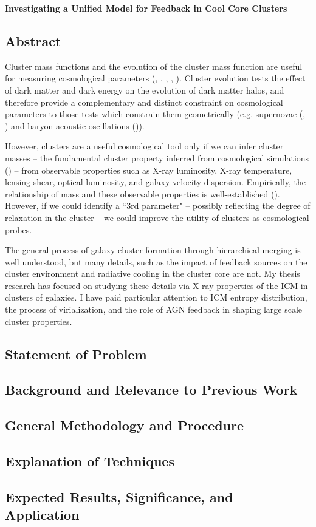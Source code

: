 \documentclass[11pt]{article}
\begin{document}
\begin{center}
\textbf{Investigating a Unified Model for Feedback in Cool Core Clusters}\\
\end{center}
\normalsize

\subsection*{Abstract}
Cluster mass functions and the evolution of the cluster mass function
are useful for measuring cosmological parameters
(\cite{1989ApJ...341L..71E}, \cite{1998ApJ...508..483W}, \cite{2001ApJ...553..545H},
\cite{2003PhRvD..67h1304H}, \cite{2004PhRvD..70l3008W}). Cluster evolution tests the
effect of dark matter and dark energy on the evolution of dark matter
halos, and therefore provide a complementary and distinct constraint
on cosmological parameters to those tests which constrain
them geometrically (e.g. supernovae (\cite{1998AJ....116.1009R},
\cite{2007ApJ...659...98R}) and baryon acoustic oscillations
(\cite{2005ApJ...633..560E})).

However, clusters are a useful cosmological tool only if we can infer
cluster masses -- the fundamental cluster property inferred from
cosmological simulations (\cite{1990ApJ...363..349E}) -- from
observable properties such as X-ray luminosity, X-ray temperature,
lensing shear, optical luminosity, and galaxy velocity
dispersion. Empirically, the relationship of mass and these observable
properties is well-established (\cite{2005RvMP...77..207V}). However,
if we could identify a ``3rd parameter" -- possibly reflecting the
degree of relaxation in the cluster -- we could improve the utility of
clusters as cosmological probes.

The general process of galaxy cluster formation through hierarchical
merging is well understood, but many details, such as the impact of
feedback sources on the cluster environment and radiative cooling in
the cluster core are not. My thesis research has focused on studying
these details via X-ray properties of the ICM in clusters of
galaxies. I have paid particular attention to ICM entropy
distribution, the process of virialization, and the role of AGN
feedback in shaping large scale cluster properties.

\subsection*{Statement of Problem}
\subsection*{Background and Relevance to Previous Work}
\subsection*{General Methodology and Procedure}
\subsection*{Explanation of Techniques}
\subsection*{Expected Results, Significance, and Application}

\clearpage


 
\end{document}
